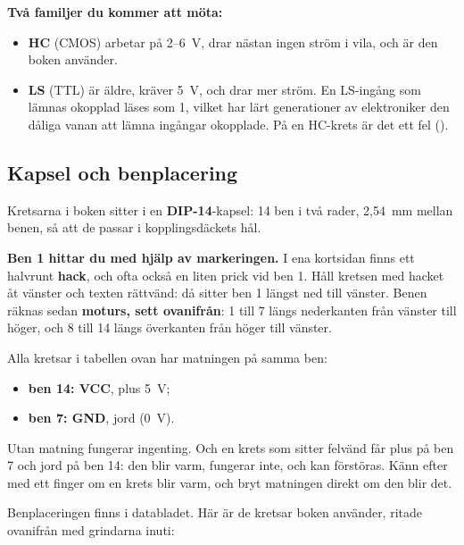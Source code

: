 \textbf{Två familjer du kommer att möta:}
\begin{itemize}
  \item \textbf{HC} (CMOS) arbetar på 2--6~V, drar nästan ingen ström i vila, och är den boken
    använder.
  \item \textbf{LS} (TTL) är äldre, kräver 5~V, och drar mer ström. En LS-ingång som lämnas
    okopplad läses som 1, vilket har lärt generationer av elektroniker den dåliga vanan att lämna
    ingångar okopplade. På en HC-krets är det ett fel ().
\end{itemize}

\subsection{Kapsel och benplacering}
\label{c4:b2}
Kretsarna i boken sitter i en \textbf{DIP-14}-kapsel: 14 ben i två rader, 2,54~mm mellan benen, så
att de passar i kopplingsdäckets hål.

\textbf{Ben 1 hittar du med hjälp av markeringen.} I ena kortsidan finns ett halvrunt
\textbf{hack}, och ofta också en liten prick vid ben 1. Håll kretsen med hacket åt vänster och
texten rättvänd: då sitter ben 1 längst ned till vänster. Benen räknas sedan \textbf{moturs, sett
ovanifrån}: 1 till 7 längs nederkanten från vänster till höger, och 8 till 14 längs överkanten från
höger till vänster.

Alla kretsar i tabellen ovan har matningen på samma ben:
\begin{itemize}
  \item \textbf{ben 14: VCC}, plus 5~V;
  \item \textbf{ben 7: GND}, jord (0~V).
\end{itemize}

Utan matning fungerar ingenting. Och en krets som sitter felvänd får plus på ben 7 och jord på ben
14: den blir varm, fungerar inte, och kan förstöras. Känn efter med ett finger om en krets blir
varm, och bryt matningen direkt om den blir det.

Benplaceringen finns i databladet. Här är de kretsar boken använder, ritade ovanifrån med grindarna
inuti:




